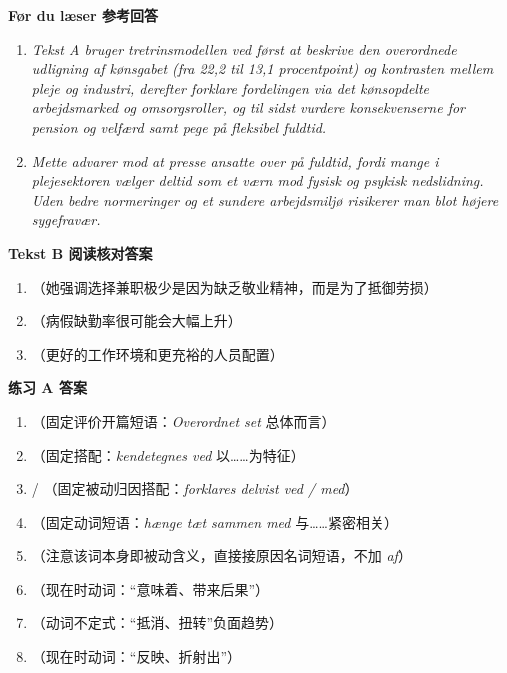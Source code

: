 \begin{answerbox}
\textbf{Før du læser 参考回答}
\begin{enumerate}
  \item \textit{Tekst A bruger tretrinsmodellen ved først at beskrive den overordnede udligning af kønsgabet (fra 22,2 til 13,1 procentpoint) og kontrasten mellem pleje og industri, derefter forklare fordelingen via det kønsopdelte arbejdsmarked og omsorgsroller, og til sidst vurdere konsekvenserne for pension og velfærd samt pege på fleksibel fuldtid.}
  \item \textit{Mette advarer mod at presse ansatte over på fuldtid, fordi mange i plejesektoren vælger deltid som et værn mod fysisk og psykisk nedslidning. Uden bedre normeringer og et sundere arbejdsmiljø risikerer man blot højere sygefravær.}
\end{enumerate}

\textbf{Tekst B 阅读核对答案}
\begin{enumerate}
  \item {}（她强调选择兼职极少是因为缺乏敬业精神，而是为了抵御劳损）
  \item {}（病假缺勤率很可能会大幅上升）
  \item {}（更好的工作环境和更充裕的人员配置）
\end{enumerate}

\textbf{练习 A 答案}
\begin{enumerate}
  \item {}（固定评价开篇短语：\textit{Overordnet set} 总体而言）
  \item {}（固定搭配：\textit{kendetegnes ved} 以……为特征）
  \item {} / （固定被动归因搭配：\textit{forklares delvist ved / med}）
  \item {}（固定动词短语：\textit{hænge tæt sammen med} 与……紧密相关）
  \item {}（注意该词本身即被动含义，直接接原因名词短语，不加 \textit{af}）
  \item {}（现在时动词：“意味着、带来后果”）
  \item {}（动词不定式：“抵消、扭转”负面趋势）
  \item {}（现在时动词：“反映、折射出”）
\end{enumerate}


\end{answerbox}
